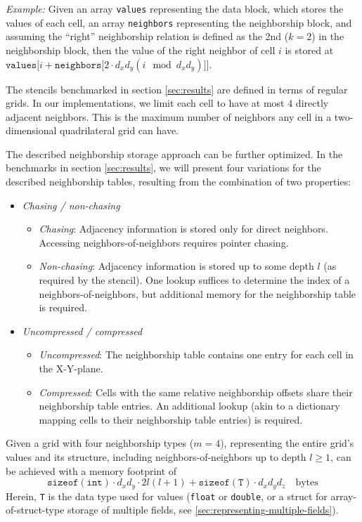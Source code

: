 \textit{Example:} Given an array \texttt{values} representing the data block, which stores the values of each cell, an array \texttt{neighbors} representing the neighborship block, and assuming the ``right'' neighborship relation is defined as the 2nd ($k=2$) in the neighborship block, then the value of the right neighbor of cell $i$ is stored at $\mathtt{values[}i + \mathtt{neighbors[}2\cdot d_xd_y(i \mod d_xd_y)\mathtt{]]}$.

The stencils benchmarked in section \ref{sec:results} are defined in terms of regular grids. In our implementations, we limit each cell to have at most $4$ directly adjacent neighbors. This is the maximum number of neighbors any cell in a two-dimensional quadrilateral grid can have.

The described neighborship storage approach can be further optimized. In the  benchmarks in section \ref{sec:results}, we will present four variations for the described neighborship tables, resulting from the combination of two properties:

\begin{itemize}
	\item \emph{Chasing / non-chasing}
	\begin{itemize}
		\item \emph{Chasing}: Adjacency information is stored only for direct neighbors. Accessing neighbors-of-neighbors requires pointer chasing.
		\item \emph{Non-chasing}: Adjacency information is stored up to some depth $l$ (as required by the stencil). One lookup suffices to determine the index of a neighbors-of-neighbors, but additional memory for the neighborship table is required.
	\end{itemize}
	\item \emph{Uncompressed / compressed}
	\begin{itemize}
		\item \emph{Uncompressed}: The neighborship table contains one entry for each cell in the X-Y-plane.
		\item \emph{Compressed}: Cells with the same relative neighborship offsets share their neighborship table entries. An additional lookup (akin to a dictionary mapping cells to their neighborship table entries) is required.
	\end{itemize}
\end{itemize}

Given a grid with four neighborship types ($m=4$), representing the entire grid's values and its structure, including neighbors-of-neighbors up to depth $l \geq 1$, can be achieved with a memory footprint of 
$$\mathtt{sizeof(int)} \cdot d_xd_y \cdot 2 l(l+1) + \mathtt{sizeof(T)}\cdot d_xd_yd_z \quad \text{bytes}$$
Herein, \texttt{T} is the data type used for values (\texttt{float} or \texttt{double}, or a struct for array-of-struct-type storage of multiple fields, see \ref{sec:representing-multiple-fields}).

